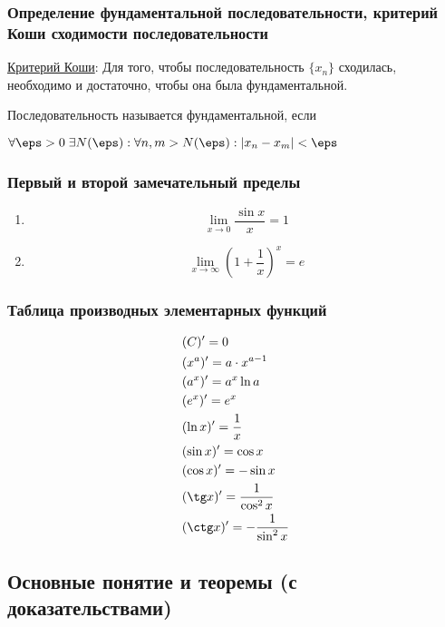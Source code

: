 \documentclass[12pt, a4paper]{article}
\begin{document}
	\subsubsection{Определение фундаментальной последовательности, критерий Коши сходимости последовательности}
	\underline{Критерий Коши}: Для того, чтобы последовательность $\{x_n\}$ сходилась, необходимо и достаточно, чтобы она была фундаментальной.

	Последовательность называется фундаментальной, если 

	$\forall \eps > 0 \; \exists N(\eps): \forall n, m > N(\eps): |x_n - x_m| < \eps$

	\subsubsection{Первый и второй замечательный пределы}
	\begin{enumerate}
		\item
		\begin{equation*}
			\lim_{x \to 0} \dfrac{\sin x}{x} = 1
		\end{equation*}

		\item
		\begin{equation*}
			\lim_{x \to \infty} \left(1 + \dfrac{1}{x}\right)^x = e
		\end{equation*}
	\end{enumerate}

	\subsubsection{Таблица производных элементарных функций}
	\begin{align*}
		&(C)' = 0 \\
		&(x^a)' = a \cdot x^{a - 1} \\
		&(a^x)' = a^x \ln a \\
		&(e^x)' = e^x \\ 
		&(\ln x)' = \dfrac{1}{x} \\
		&(\sin x)' = \cos x \\
		&(\cos x)' = - \sin x \\
		&(\tg x)' = \dfrac{1}{\cos^2 x} \\
		&(\ctg x)' = -\dfrac{1}{\sin^2 x} \\
	\end{align*}

	\subsection{Основные понятие и теоремы (с доказательствами)}
\end{document}

